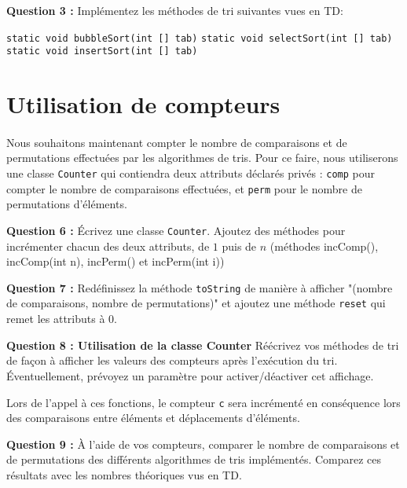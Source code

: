 \documentclass[iutinfo, a4paper, nocorrection, 10pt]{ustl-tdtp}
\begin{document}
\textbf{Question 3 :}\newline
Implémentez les méthodes de tri suivantes vues en TD: 

 \texttt{static void bubbleSort(int [] tab)}\newline
 \texttt{static void selectSort(int [] tab)}\newline
 \texttt{static void insertSort(int [] tab)}



\section{Utilisation de compteurs}
\paragraph{}
Nous souhaitons maintenant compter le nombre de comparaisons et de permutations effectuées par les algorithmes de tris. Pour ce faire, nous utiliserons une classe \texttt{Counter} qui contiendra deux attributs déclarés privés : \texttt{comp} pour compter le nombre de comparaisons effectuées, et \texttt{perm} pour le nombre de permutations d'éléments.\newline


\textbf{Question 6 : }\newline
Écrivez une classe \texttt{Counter}. Ajoutez des méthodes pour incrémenter chacun des deux attributs, de $1$ puis de $n$ (méthodes incComp(), incComp(int
n), incPerm() et incPerm(int i))\newline


\textbf{Question 7 : } \newline
Redéfinissez la méthode \texttt{toString} de manière à afficher "(nombre de comparaisons, nombre de permutations)" et ajoutez une méthode \texttt{reset} qui remet les attributs à 0.\newline


\textbf{Question 8 : Utilisation de la classe Counter}\newline
Réécrivez vos méthodes de tri de façon à afficher les valeurs des compteurs après l'exécution du tri. Éventuellement, prévoyez un paramètre pour activer/déactiver cet affichage.

Lors de l'appel à ces fonctions, le compteur \texttt{c} sera incrémenté en conséquence lors des comparaisons entre éléments et
déplacements d'éléments.\newline


\textbf{Question 9 : } \newline
À l'aide de vos compteurs, comparer le nombre de comparaisons et de permutations des différents algorithmes de tris implémentés. Comparez ces résultats avec les nombres théoriques vus en TD.
\end{document}
